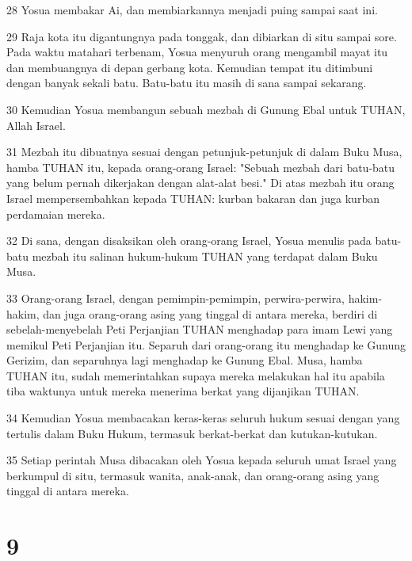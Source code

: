 \par 28 Yosua membakar Ai, dan membiarkannya menjadi puing sampai saat ini.
\par 29 Raja kota itu digantungnya pada tonggak, dan dibiarkan di situ sampai sore. Pada waktu matahari terbenam, Yosua menyuruh orang mengambil mayat itu dan membuangnya di depan gerbang kota. Kemudian tempat itu ditimbuni dengan banyak sekali batu. Batu-batu itu masih di sana sampai sekarang.
\par 30 Kemudian Yosua membangun sebuah mezbah di Gunung Ebal untuk TUHAN, Allah Israel.
\par 31 Mezbah itu dibuatnya sesuai dengan petunjuk-petunjuk di dalam Buku Musa, hamba TUHAN itu, kepada orang-orang Israel: "Sebuah mezbah dari batu-batu yang belum pernah dikerjakan dengan alat-alat besi." Di atas mezbah itu orang Israel mempersembahkan kepada TUHAN: kurban bakaran dan juga kurban perdamaian mereka.
\par 32 Di sana, dengan disaksikan oleh orang-orang Israel, Yosua menulis pada batu-batu mezbah itu salinan hukum-hukum TUHAN yang terdapat dalam Buku Musa.
\par 33 Orang-orang Israel, dengan pemimpin-pemimpin, perwira-perwira, hakim-hakim, dan juga orang-orang asing yang tinggal di antara mereka, berdiri di sebelah-menyebelah Peti Perjanjian TUHAN menghadap para imam Lewi yang memikul Peti Perjanjian itu. Separuh dari orang-orang itu menghadap ke Gunung Gerizim, dan separuhnya lagi menghadap ke Gunung Ebal. Musa, hamba TUHAN itu, sudah memerintahkan supaya mereka melakukan hal itu apabila tiba waktunya untuk mereka menerima berkat yang dijanjikan TUHAN.
\par 34 Kemudian Yosua membacakan keras-keras seluruh hukum sesuai dengan yang tertulis dalam Buku Hukum, termasuk berkat-berkat dan kutukan-kutukan.
\par 35 Setiap perintah Musa dibacakan oleh Yosua kepada seluruh umat Israel yang berkumpul di situ, termasuk wanita, anak-anak, dan orang-orang asing yang tinggal di antara mereka.

\chapter{9}

